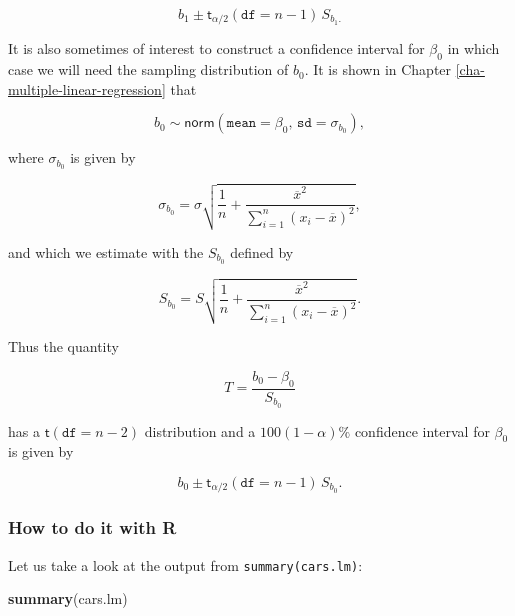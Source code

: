 \documentclass[]{book}
\newenvironment{Shaded}{\begin{snugshade}}{\end{snugshade}}
\newcommand{\KeywordTok}[1]{\textcolor[rgb]{0.13,0.29,0.53}{\textbf{{#1}}}}
\newcommand{\NormalTok}[1]{{#1}}
\numberwithin{equation}{chapter}
\numberwithin{figure}{chapter}
\theoremstyle{plain}
\theoremstyle{definition}
\theoremstyle{remark}
\theoremstyle{definition}
\theoremstyle{definition}
\theoremstyle{remark}
\begin{document}
\begin{equation}
b_{1}\pm\mathsf{t}_{\alpha/2}(\mathtt{df}=n-1)\, S_{b_{1}.}
\end{equation}

It is also sometimes of interest to construct a confidence interval for
\(\beta_{0}\) in which case we will need the sampling distribution of
\(b_{0}\). It is shown in Chapter \ref{cha-multiple-linear-regression}
that

\begin{equation}
b_{0}\sim\mathsf{norm}\left(\mathtt{mean}=\beta_{0},\,\mathtt{sd}=\sigma_{b_{0}}\right),
\end{equation}

where \(\sigma_{b_{0}}\) is given by

\begin{equation}
\sigma_{b_{0}}=\sigma\sqrt{\frac{1}{n}+\frac{\overline{x}^{2}}{\sum_{i=1}^{n}(x_{i}-\overline{x})^{2}}},
\end{equation}

and which we estimate with the \(S_{b_{0}}\) defined by

\begin{equation}
S_{b_{0}}=S\sqrt{\frac{1}{n}+\frac{\overline{x}^{2}}{\sum_{i=1}^{n}(x_{i}-\overline{x})^{2}}}.
\end{equation}

Thus the quantity

\begin{equation}
T=\frac{b_{0}-\beta_{0}}{S_{b_{0}}}
\end{equation}

has a \(\mathsf{t}(\mathtt{df}=n-2)\) distribution and a
\(100(1-\alpha)\%\) confidence interval for \(\beta_{0}\) is given by

\begin{equation}
b_{0}\pm\mathsf{t}_{\alpha/2}(\mathtt{df}=n-1)\, S_{b_{0}}.
\end{equation}

\subsubsection{How to do it with R}\label{how-to-do-it-with-r-42}

Let us take a look at the output from \texttt{summary(cars.lm)}:

\begin{Shaded}
\begin{Highlighting}[]
\KeywordTok{summary}\NormalTok{(cars.lm)}
\end{Highlighting}
\end{Shaded}
\end{document}
